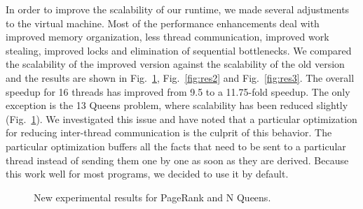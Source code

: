 \documentclass[10pt]{article}
\begin{document}
In order to improve the scalability of our runtime, we made several adjustments
to the virtual machine. Most of the performance enhancements deal with improved
memory organization, less thread communication, improved work stealing, improved
locks and elimination of sequential bottlenecks. We compared the scalability of the
improved version against the scalability of the old version and the results are
shown in Fig.~\ref{fig:res1}, Fig.~\ref{fig:res2} and Fig.~\ref{fig:res3}. The
overall speedup for 16 threads has improved from 9.5 to a 11.75-fold speedup.
The only exception is the 13 Queens problem, where scalability has been reduced
slightly (Fig.~\ref{fig:res1}). We investigated this issue and have noted that
a particular optimization for reducing inter-thread communication is the culprit
of this behavior. The particular optimization buffers all the facts
that need to be sent to a particular thread instead of sending them one by one as
soon as they are derived. Because this work well for most programs, we decided to
use it by default.

\begin{figure}[h]
\begin{center}
\end{center}
\caption{New experimental results for PageRank and N Queens.}
\label{fig:res1}
\end{figure}
\end{document}
